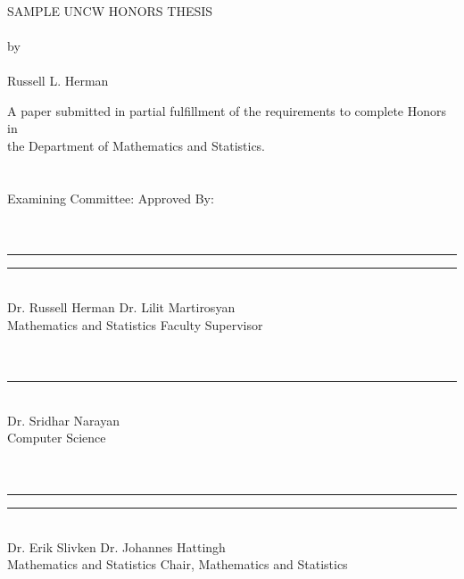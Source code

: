 \documentclass[12 pt]{uncw_thesis}
\theoremstyle{plain}
\theoremstyle{remark}
\theoremstyle{definition}
\begin{document}
%
%
\pagestyle{empty}
\begin{singlespace}
\begin{center}
     \hskip 1pt \\    %
     {\large SAMPLE UNCW HONORS THESIS}\\
     \hskip 1pt \\
     by \\
     \hskip 1pt \\    %
     Russell L. Herman 
\end{center} %
     A paper submitted in partial fulfillment of the requirements to complete Honors in \\
     the Department of Mathematics and Statistics. \\
     \hskip 1pt \\
     \hskip 1pt \\
Examining Committee:\hspace*{1.6in} Approved By: \\
 \\ 
 \\
\rule{6.5cm}{.01in}\hspace*{.7in} \rule{6.5cm}{.01in}\\ 
Dr. Russell Herman
\hspace*{1.77in} Dr. Lilit Martirosyan \\ Mathematics and Statistics\hspace*{1.31in} Faculty Supervisor \\ 
\\
\\
\rule{6.5cm}{.01in}\\
Dr. Sridhar Narayan \\ 
Computer Science\\
\\ 
\\
\rule{6.5cm}{.01in} \hspace*{.7in} \rule{6.5cm}{.01in}\\ 
Dr. Erik Slivken  \hspace*{2.05in} Dr. Johannes Hattingh\\
Mathematics and Statistics \hspace*{1.29in} Chair, Mathematics and Statistics
\\
\\
\\ %

\end{singlespace}
\end{document}
